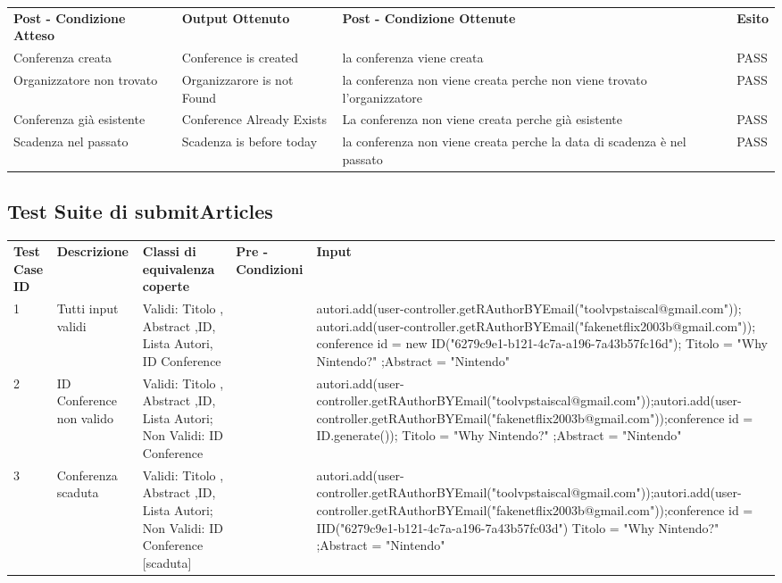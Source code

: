 \begin{tabular}{|p{3.5cm}|p{3cm}|p{3cm}|p{1cm}|}
\hline
\rowcolor{SkyBlue}
\multicolumn{4}{l}{\textbf{createConferenc p2}}\\
\hline
\rowcolor{Red}
 \textbf{Post - Condizione Atteso} & \textbf{Output Ottenuto}& \textbf{Post - Condizione Ottenute}& \textbf{Esito}\\
\hline
Conferenza creata& Conference is created & la conferenza viene creata & PASS\\
\hline
Organizzatore non trovato&Organizzarore is not Found& la conferenza non viene creata perche non viene trovato l'organizzatore & PASS\\
\hline
Conferenza già esistente&Conference Already Exists& La conferenza non viene creata perche già esistente& PASS\\
\hline
Scadenza nel passato&Scadenza is before today&la conferenza non viene creata perche la data di scadenza è nel passato& PASS\\ 
\hline
\end{tabular}

\subsection{Test Suite di submitArticles}
\begin{tabular}{|p{2.5cm}|p{2.5cm}|p{3cm}|p{1.5cm}|p{4cm}|}
\hline
\rowcolor{SkyBlue}
\multicolumn{5}{l}{\textbf{submitArticles p1}}\\
\hline
\rowcolor{Red}
\textbf{Test Case ID} & \textbf{Descrizione} & \textbf{Classi di equivalenza coperte} & \textbf{Pre - Condizioni} & \textbf{Input} \\
\hline
1 & Tutti input validi &  Validi: Titolo , Abstract ,ID, Lista Autori, ID Conference && autori.add(user-controller.getRAuthorBYEmail("toolvpstaiscal@gmail.com")); autori.add(user-controller.getRAuthorBYEmail("fakenetflix2003b@gmail.com")); conference id = new ID("6279c9e1-b121-4c7a-a196-7a43b57fc16d"); Titolo = "Why Nintendo?" ;Abstract = "Nintendo" \\
\hline
2& ID Conference non valido &Validi:   Titolo , Abstract ,ID, Lista Autori; Non Validi: ID Conference  &&autori.add(user-controller.getRAuthorBYEmail("toolvpstaiscal@gmail.com"));autori.add(user-controller.getRAuthorBYEmail("fakenetflix2003b@gmail.com"));conference id = ID.generate()); Titolo = "Why Nintendo?" ;Abstract = "Nintendo" \\
\hline
3& Conferenza scaduta & Validi: Titolo , Abstract ,ID, Lista Autori; Non Validi: ID Conference [scaduta] &&autori.add(user-controller.getRAuthorBYEmail("toolvpstaiscal@gmail.com"));autori.add(user-controller.getRAuthorBYEmail("fakenetflix2003b@gmail.com"));conference id = IID("6279c9e1-b121-4c7a-a196-7a43b57fc03d") Titolo = "Why Nintendo?" ;Abstract = "Nintendo"\\
\hline
\end{tabular}


